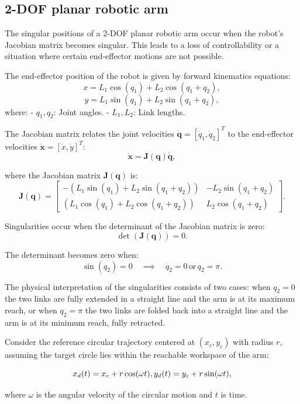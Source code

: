 \documentclass[11pt,american]{article}
\theoremstyle{definition}
\theoremstyle{plain}
\theoremstyle{remark}
\begin{document}
\subsection{2-DOF planar robotic arm}\label{sec:arm}

The singular positions of a 2-DOF planar robotic arm occur when the robot's Jacobian matrix becomes singular. This leads to a loss of controllability or a situation where certain end-effector motions are not possible.

The end-effector position of the robot is given by forward kinematics equations:
\[
x = L_1 \cos(q_1) + L_2 \cos(q_1 + q_2),
\]
\[
y = L_1 \sin(q_1) + L_2 \sin(q_1 + q_2),
\]
where:
- \( q_1, q_2 \): Joint angles.
- \( L_1, L_2 \): Link lengths.

The Jacobian matrix relates the joint velocities \( \dot{\mathbf{q}} = [\dot{q}_1, \dot{q}_2]^T \) to the end-effector velocities \( \dot{\mathbf{x}} = [\dot{x}, \dot{y}]^T \):
\[
\dot{\mathbf{x}} = \mathbf{J}(\mathbf{q}) \dot{\mathbf{q}},
\]

where the Jacobian matrix \( \mathbf{J}(\mathbf{q}) \) is:
\[
\mathbf{J}(\mathbf{q}) =
\begin{bmatrix}
-\left( L_1 \sin(q_1) + L_2 \sin(q_1 + q_2) \right) & -L_2 \sin(q_1 + q_2) \\
\left( L_1 \cos(q_1) + L_2 \cos(q_1 + q_2) \right) & L_2 \cos(q_1 + q_2)
\end{bmatrix}.
\]

Singularities occur when the determinant of the Jacobian matrix is zero:
\[
\det(\mathbf{J}(\mathbf{q})) = 0.
\]

The determinant becomes zero when:
\[
\sin(q_2) = 0 \quad \implies \quad q_2 = 0 \, \text{or} \, q_2 = \pi.
\]

The physical interpretation of the singularities consists of two cases: when \( q_2 = 0 \) the two links are fully extended in a straight line and the arm is at its maximum reach, or when \( q_2 = \pi \) the two links are folded back into a straight line and the arm is at its minimum reach, fully retracted.

Consider the reference circular trajectory centered at \( (x_c, y_c) \) with radius \( r \), assuming the target circle lies within the reachable workspace of the arm:

\[
  x_d(t) = x_c + r \cos(\omega t), \\
  y_d(t) = y_c + r \sin(\omega t),
\]

where \( \omega \) is the angular velocity of the circular motion and \( t \) is time.
\end{document}
